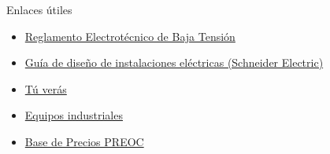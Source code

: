 \documentclass[xcolor={usenames,svgnames,dvipsnames}]{beamer}
\begin{document}
\begin{frame}[label={sec:orgf83ddc0}]{Enlaces útiles}
\begin{itemize}
\item \href{http://www.f2i2.net/legislacionseguridadindustrial/Si\_ambito.aspx?id\_am=76}{Reglamento Electrotécnico de Baja Tensión}

\item \href{http://www.schneiderelectric.es/sites/spain/es/productos-servicios/distribucion-electrica/descarga/pdf-guia-diseno-instalaciones-electricas.page}{Guía de diseño de instalaciones eléctricas (Schneider Electric)}

\item \href{http://tuveras.com/index.html}{Tú verás}

\item \href{http://www.directindustry.com/}{Equipos industriales}

\item \href{http://www.preoc.es/}{Base de Precios PREOC}
\end{itemize}
\end{frame}
\end{document}
